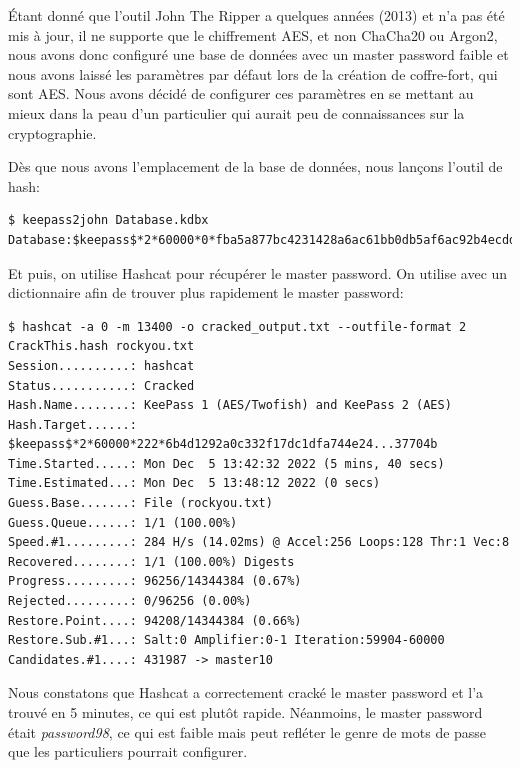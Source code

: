 Étant donné que l'outil John The Ripper a quelques années (2013) et n'a pas été mis à jour, il ne supporte que le chiffrement AES, et non ChaCha20 ou Argon2, nous avons donc configuré une base de données avec un master password faible et nous avons laissé les paramètres par défaut lors de la création de coffre-fort, qui sont AES. Nous avons décidé de configurer ces paramètres en se mettant au mieux dans la peau d'un particulier qui aurait peu de connaissances sur la cryptographie.

Dès que nous avons l'emplacement de la base de données, nous lançons l'outil de hash:

\begin{lstlisting}[style=bash, caption=Outil keepass2john]
$ keepass2john Database.kdbx
Database:$keepass$*2*60000*0*fba5a877bc4231428a6ac61bb0db5af6ac92b4ecdd2f35bcc4bd3de7f76ffdd9*30de72f912159a9a666e3a624546a09761e4a8932a531d2f56d36d3e08c07dc0*74e5d2fb309d9f3ef81d4fbf78562b91*31af5d12f9d189defa02193b8d4c2db3d3c7f6cdd95ae7d37552c7121848605c*5f36c21ec05f1d97be40c4ce64d2870f2f74392e0ca3acd40304afaa6c7461df
\end{lstlisting}

Et puis, on utilise Hashcat pour récupérer le master password. On utilise avec un dictionnaire afin de trouver plus rapidement le master password:

\begin{lstlisting}[style=bash, caption=Commande Hashcat]
$ hashcat -a 0 -m 13400 -o cracked_output.txt --outfile-format 2 CrackThis.hash rockyou.txt
Session..........: hashcat
Status...........: Cracked
Hash.Name........: KeePass 1 (AES/Twofish) and KeePass 2 (AES)
Hash.Target......: $keepass$*2*60000*222*6b4d1292a0c332f17dc1dfa744e24...37704b
Time.Started.....: Mon Dec  5 13:42:32 2022 (5 mins, 40 secs)
Time.Estimated...: Mon Dec  5 13:48:12 2022 (0 secs)
Guess.Base.......: File (rockyou.txt)
Guess.Queue......: 1/1 (100.00%)
Speed.#1.........: 284 H/s (14.02ms) @ Accel:256 Loops:128 Thr:1 Vec:8
Recovered........: 1/1 (100.00%) Digests
Progress.........: 96256/14344384 (0.67%)
Rejected.........: 0/96256 (0.00%)
Restore.Point....: 94208/14344384 (0.66%)
Restore.Sub.#1...: Salt:0 Amplifier:0-1 Iteration:59904-60000
Candidates.#1....: 431987 -> master10
\end{lstlisting}

Nous constatons que Hashcat a correctement cracké le master password et l'a trouvé en 5 minutes, ce qui est plutôt rapide. Néanmoins, le master password était \textit{password98}, ce qui est faible mais peut refléter le genre de mots de passe que les particuliers pourrait configurer. 

